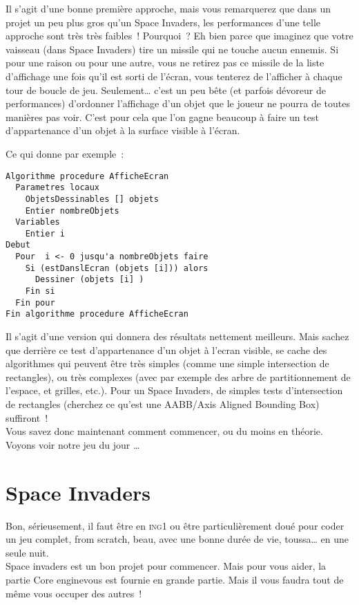 Il s'agit d'une bonne première approche, mais vous remarquerez que dans un projet un peu plus gros qu'un Space Invaders, les performances d'une telle approche sont très très faibles~! Pourquoi~? Eh bien parce que imaginez que votre vaisseau (dans Space Invaders) tire un missile qui ne touche aucun ennemis. Si pour une raison ou pour une autre, vous ne retirez pas ce missile de la liste d'affichage une fois qu’il est sorti de l'écran, vous tenterez de l’afficher à chaque tour de boucle de jeu. Seulement\ldots{} c’est un peu bête (et parfois dévoreur de performances) d'ordonner l'affichage d'un objet que le joueur ne pourra de toutes manières pas voir. C'est pour cela que l'on gagne beaucoup à faire un test d'appartenance d'un objet à la surface visible à l'écran.

Ce qui donne par exemple~:

\begin{verbatim}
Algorithme procedure AfficheEcran
  Parametres locaux
    ObjetsDessinables [] objets
    Entier nombreObjets
  Variables
    Entier i
Debut
  Pour  i <- 0 jusqu'a nombreObjets faire
    Si (estDanslEcran (objets [i])) alors
      Dessiner (objets [i] )
    Fin si
  Fin pour
Fin algorithme procedure AfficheEcran
\end{verbatim}

Il s'agit d'une version qui donnera des résultats nettement meilleurs. Mais sachez que derrière ce test d'appartenance d'un objet à l'ecran visible, se cache des algorithmes qui peuvent être très simples (comme une simple intersection de rectangles), ou très complexes (avec par exemple des arbre de partitionnement de l'espace, et grilles, etc.). Pour un Space Invaders, de simples tests d'intersection de rectangles (cherchez ce qu’est une AABB/Axis Aligned Bounding Box) suffiront~!\\

Vous savez donc maintenant comment commencer, ou du moins en théorie. Voyons voir notre jeu du jour \ldots


\section{Space Invaders}

Bon, sérieusement, il faut être en \textsc{ing1} ou être particulièrement doué pour coder un jeu complet, \og from scratch\fg, beau, avec une bonne durée de vie, toussa\ldots{} en une seule nuit.\\

Space invaders est un bon projet pour commencer. Mais pour vous aider, la partie \og Core engine\fg vous est fournie en grande partie. Mais il vous faudra tout de même vous occuper des autres~!

